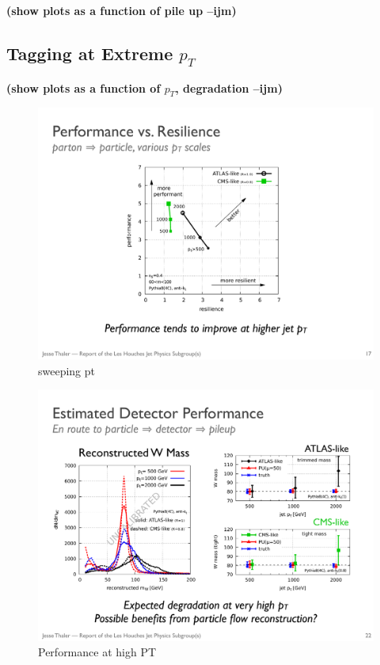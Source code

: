 \documentclass[11pt,letterpaper]{article}
\newcommand{\ijm}[1]{\textbf{\textcolor{llblue}{(#1 --ijm)}}}
\begin{document}
\ijm{show plots as a function of pile up}

\subsection{Tagging at Extreme $p_T$}\label{sec:pt_robust}

\ijm{show plots as a function of $p_T$, degradation}

\begin{figure}
\begin{center}
\includegraphics[width=0.4\columnwidth]{figures/sweep_pt}
\end{center}
\caption{sweeping pt}
\label{fig:nolabel}
\end{figure}

\begin{figure}
\begin{center}
\includegraphics[width=0.75\columnwidth]{figures/pt_degrade}
\end{center}
\caption{Performance at high PT}
\label{fig:nolabel}
\end{figure}
\end{document}
